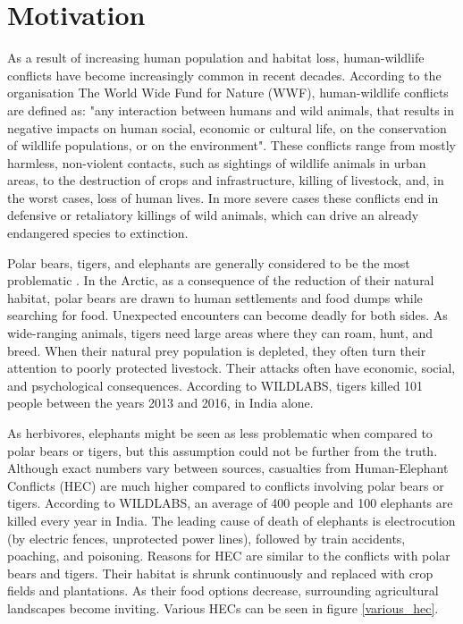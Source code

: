 \section{ Motivation}

As a result of increasing human population and habitat loss, human-wildlife conflicts have become increasingly common in recent decades\cite{philip-wildlife}.
According to the organisation The World Wide Fund for Nature (WWF), human-wildlife conflicts are defined as: "any interaction between humans and wild animals, that results in negative impacts on human social, economic or cultural life, on the conservation of wildlife populations, or on the environment"\cite{conflict-manual}.
These conflicts range from mostly harmless, non-violent contacts, such as sightings of wildlife animals in urban areas, to the destruction of crops and infrastructure, killing of livestock, and, in the worst cases, loss of human lives.
In more severe cases these conflicts end in defensive or retaliatory killings of wild animals, which can drive an already endangered species to extinction.

Polar bears, tigers, and elephants are generally considered to be the most problematic \cite{philip-wildlife}.
In the Arctic, as a consequence of the reduction of their natural habitat, polar bears are drawn to human settlements and food dumps while searching for food\cite{wildlabs-polarbears}.
Unexpected encounters can become deadly for both sides.
As wide-ranging animals, tigers need large areas where they can roam, hunt, and breed\cite{wildlabs-tigers}.
When their natural prey population is depleted, they often turn their attention to poorly protected livestock. 
Their attacks often have economic, social, and psychological consequences.
According to WILDLABS, tigers killed 101 people between the years 2013 and 2016, in India alone\cite{wildlabs-tigers}.

As herbivores, elephants might be seen as less problematic when compared to polar bears or tigers, but this assumption could not be further from the truth.
Although exact numbers vary between sources, casualties from Human-Elephant Conflicts (HEC) are much higher compared to conflicts involving polar bears or tigers.
According to WILDLABS, an average of 400 people and 100 elephants are killed every year in India\cite{wildlabs-elephants}. 
The leading cause of death of elephants is electrocution (by electric fences, unprotected power lines), followed by train accidents, poaching, and poisoning\cite{cause-of-death}.
Reasons for HEC are similar to the conflicts with polar bears and tigers.
Their habitat is shrunk continuously and replaced with crop fields and plantations.
As their food options decrease, surrounding agricultural landscapes become inviting.  
Various HECs can be seen in figure \ref{various_hec}.

